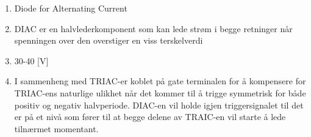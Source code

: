 \begin{solution}[name=Løsningsforslag]
	\begin{enumerate}[label=\roman*)]
	\item Diode for Alternating Current
	\item DIAC er en halvlederkomponent som kan lede strøm i begge retninger når spenningen over den overstiger en viss terskelverdi
	\item 30-40 [V]
	\item I sammenheng med TRIAC-er koblet på gate terminalen for å kompensere for TRIAC-ens naturlige ulikhet når det kommer til å trigge symmetrisk for både positiv og negativ halvperiode. DIAC-en vil holde igjen triggersignalet til det er på et nivå som fører til at begge delene av TRAIC-en vil starte å lede tilnærmet momentant.
\end{enumerate}
\end{solution}

